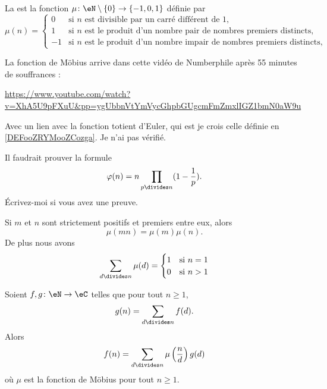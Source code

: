 \begin{definition}  \label{DefWXBkOxg}
	La  est la fonction \( \mu\colon \eN\setminus\{ 0 \}\to \{ -1,0,1 \}\) définie par
	\begin{equation}
		\mu(n)=\begin{cases}
			0  & \text{si } n\text{ est divisible par un carré différent de } 1\text{,}               \\
			1  & \text{si } n\text{ est le produit d'un nombre pair de nombres premiers distincts,}   \\
			-1 & \text{si } n\text{ est le produit d'un nombre impair de nombres premiers distincts,}
		\end{cases}
	\end{equation}
\end{definition}

\begin{normaltext}
	La fonction de Möbius arrive dans cette vidéo de Numberphile après 55 minutes de souffrances :
	\begin{center}
		\url{https://www.youtube.com/watch?v=XhA5U9pFXuU&pp=ygUbbnVtYmVycGhpbGUgcmFmZmxlIGZ1bmN0aW9u}
	\end{center}
	Avec un lien avec la fonction totient d'Euler, qui est je crois celle définie en \ref{DEFooZRYMooZCozga}. Je n'ai pas vérifié.

	Il faudrait prouver la formule
	\begin{equation}
		\varphi(n)=n\prod_{p\divides n}(1-\frac{1}{ p}).
	\end{equation}
	Écrivez-moi si vous avez une preuve.
\end{normaltext}

\begin{proposition}     \label{PROPooOVYJooFvmxyj}
	Si \( m\) et \( n\) sont strictement positifs et premiers entre eux, alors
	\begin{equation}
		\mu(mn)=\mu(m)\mu(n).
	\end{equation}
	De plus nous avons
	\begin{equation}
		\sum_{d\divides n}\mu(d)=\begin{cases}
			1 & \text{si } n=1 \\
			0 & \text{si } n>1
		\end{cases}
	\end{equation}
\end{proposition}

\begin{proposition}    \label{PropLBZoIoO}
	Soient \( f,g\colon \eN\to \eC\) telles que pour tout \( n\geq 1\),
	\begin{equation}
		g(n)=\sum_{d\divides n}f(d).
	\end{equation}
	Alors
	\begin{equation}
		f(n)=\sum_{d\divides n}\mu\left( \frac{ n }{ d } \right)g(d)
	\end{equation}
	où \( \mu\) est la fonction de Möbius pour tout \( n\geq 1\).
\end{proposition}

